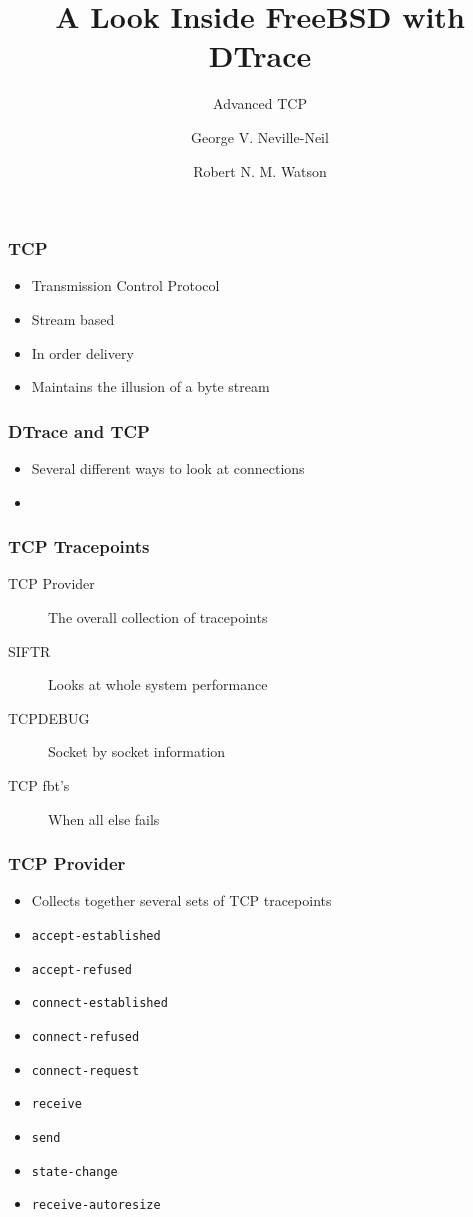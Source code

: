 \documentclass[pdftex]{beamer}
\begin{document}

\title{A Look Inside FreeBSD with DTrace}
\subtitle{Advanced TCP}
\author[shortname]{George V. Neville-Neil \and Robert N. M. Watson}

\begin{frame}
  \frametitle{TCP}
  \begin{itemize}
  \item Transmission Control Protocol
  \item Stream based
  \item In order delivery
  \item Maintains the illusion of a byte stream
  \end{itemize}
\end{frame}

\begin{frame}
  \frametitle{DTrace and TCP}
  \begin{itemize}
  \item Several different ways to look at connections
  \item 
  \end{itemize}
\end{frame}

\begin{frame}
  \frametitle{TCP Tracepoints}
  \begin{description}
  \item[TCP Provider] The overall collection of tracepoints
  \item[SIFTR] Looks at whole system performance
  \item[TCPDEBUG] Socket by socket information
  \item[TCP fbt's] When all else fails
\end{description}
\end{frame}

\begin{frame}[fragile]
  \frametitle{TCP Provider}
  \begin{itemize}
  \item Collects together several sets of TCP tracepoints
  \end{itemize}
  \begin{itemize}
  \item \verb|accept-established|
  \item \verb|accept-refused| 
  \item \verb|connect-established|  
  \item \verb|connect-refused|  
  \item \verb|connect-request|  
  \item \verb|receive|  
  \item \verb|send|  
  \item \verb|state-change|  
  \item \verb|receive-autoresize|  
  \end{itemize}
\end{frame}
\end{document}
